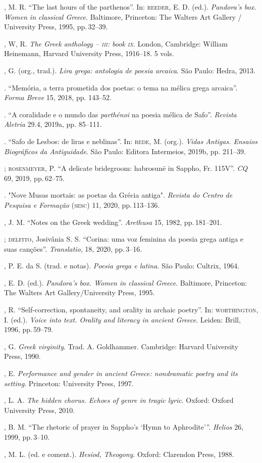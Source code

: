 \begin{bibliohedra}
, M. R. “The last hours of the parthenos”. In: \textsc{reeder}, E. D. (ed.). \textit{Pandora’s box. Women in classical Greece}. Baltimore, Princeton: The Walters Art Gallery / University Press, 1995, pp.\,32--39. 

, W, R. \textit{The Greek anthology -- \textsc{iii}: book \textsc{ix}}. London, Cambridge: William Heinemann, Harvard University Press, 1916--18. 5 vols.

, G. (org., trad.). \textit{Lira grega: antologia de poesia arcaica}. São Paulo: Hedra, 2013.

\titidem. “Memória, a terra prometida dos poetas: o tema na mélica grega arcaica”. \textit{Forma Breve} 15, 2018, pp. 143--52. 

\titidem. “A coralidade e o mundo das \textit{parthénoi} na poesia mélica de Safo”. \textit{Revista Aletria} 29.4, 2019a, pp. 85--111. 

\titidem. “Safo de Lesbos: de liras e neblinas”. In: \textsc{rede}, M. (org.). \textit{Vidas Antigas. Ensaios Biográficos da Antiguidade}. São Paulo: Editora Intermeios, 2019b, pp. 211--39.

\titidem; \textsc{rosenmeyer}, P. “A delicate bridegroom: habrosunē in Sappho, Fr. 115V”. \textit{CQ} 69, 2019, pp.\,62--75.

\titidem. "Nove Musas mortais: as poetas da Grécia antiga". \textit{Revista do Centro de Pesquisa e Formação} (\textsc{sesc}) 11, 2020, pp.\,113--136.

, J. M. “Notes on the Greek wedding”. \textit{Arethusa} 15, 1982, pp.\,181--201. 

\titidem; \textsc{delfito}, Josivânia S. S. “Corina: uma voz feminina da poesia grega antiga e suas canções”. \textit{Translatio},  18, 2020, pp.\,3--16.

, P. E. da S. (trad. e notas). \textit{Poesia grega e latina}. São Paulo: Cultrix, 1964.

, E. D. (ed.). \textit{Pandora’s box. Women in classical Greece}. Baltimore, Princeton: The Walters Art Gallery/University Press, 1995.


, R. “Self-correction, spontaneity, and orality in archaic poetry”. In: \textsc{worthington}, I. (ed.). \textit{Voice into text. Orality and literacy in ancient Greece}. Leiden: Brill, 1996, pp.\,59--79.

, G. \textit{Greek virginity}. Trad. A. Goldhammer. Cambridge: Harvard University Press, 1990.

, E. \textit{Performance and gender in ancient Greece: nondramatic poetry and its setting}. Princeton: University Press, 1997.

, L. A. \textit{The hidden chorus. Echoes of genre in tragic lyric}. Oxford: Oxford University Press, 2010.

, B. M. “The rhetoric of prayer in Sappho's `Hymn to Aphrodite'”. \textit{Helios} 26, 1999, pp.\,3--10.

, M. L. (ed. e coment.). \textit{Hesiod, Theogony}. Oxford: Clarendon Press, 1988.


\end{bibliohedra}

